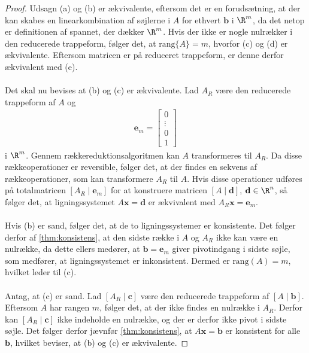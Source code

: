 \begin{proof}
%
Udsagn (a) og (b) er ækvivalente, eftersom det er en forudsætning, at der kan skabes en linearkombination af søjlerne i $A$ for ethvert $\mathbf{b}$ i $\R^m$, da det netop er definitionen af spannet, der dækker $\R^m$. 
%
Hvis der ikke er nogle nulrækker i den reducerede trappeform, følger det, at $\text{rang}\{A\} = m$, hvorfor (c) og (d) er ækvivalente. 
Eftersom matricen er på reduceret trappeform, er denne derfor ækvivalent med (e).
\\\\
Det skal nu bevises at (b) og (c) er ækvivalente. 
Lad $A_R$ være den reducerede trappeform af $A$ og
%
\begin{align*}
\mathbf{\mathbf{e}}_m = \begin{bmatrix}
		0 \\
        \vdots \\
        0 \\
        1 
\end{bmatrix}
\end{align*}
%
i $\R^m$. 
Gennem rækkereduktionsalgoritmen kan $A$ transformeres til $A_R$. 
Da disse rækkeoperationer er reversible, følger det, at der findes en sekvens af rækkeoperationer, som kan transformere $A_R$ til $A$.
Hvis disse operationer udføres på totalmatricen 
$[A_R \mid \mathbf{e}_m]$ 
for at konstruere matricen 
$[A \mid \mathbf{d}]$, 
$\mathbf{d} \in \R^n$, 
så følger det, at ligningssystemet $A\mathbf{x}=\mathbf{
d}$ er ækvivalent med $A_R\mathbf{x}=\mathbf{e}_m$.
\\\\
Hvis (b) er sand, følger det, at de to ligningssystemer er konsistente. 
Det følger derfor af \ref{thm:konsistens}, at den sidste række i $A$ og $A_R$ ikke kan være en nulrække, da dette ellers medører, at $\textbf{b} = \mathbf{e}_m$ giver pivotindgang i sidste søjle, som medfører, at ligningssystemet er inkonsistent.
Dermed er $\text{rang}(A)=m$, hvilket leder til (c).
\\\\
Antag, at (c) er sand. 
Lad $[A_R \mid \mathbf{c}]$ 
være den reducerede trappeform af 
$[A \mid \mathbf{b}]$.
Eftersom $A$ har rangen $m$, følger det, at der ikke findes en nulrække i $A_R$.
Derfor kan $[A_R \mid \mathbf{c}]$ ikke indeholde en nulrække, og der er derfor ikke pivot i sidste søjle.
Det følger derfor jævnfør \ref{thm:konsistens}, at $A\mathbf{x}=\mathbf{b}$ er konsistent for alle $\mathbf{b}$, hvilket beviser, at (b) og (c) er ækvivalente.
%
\end{proof}
